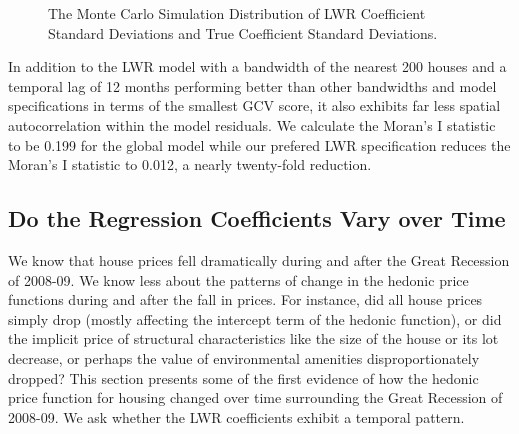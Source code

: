 \documentclass{article}\usepackage{graphicx, color}
\begin{document}
\begin{figure}
 \caption{The Monte Carlo Simulation Distribution of LWR Coefficient Standard Deviations and True Coefficient Standard Deviations.}\label{fig:MCsds}
\end{figure}
 
In addition to the LWR model with a bandwidth of the nearest 200 houses and a temporal lag of 12 months performing better than other bandwidths and model specifications in terms of the smallest GCV score, it also exhibits far less spatial autocorrelation within the model residuals. We calculate the Moran’s I statistic to be 0.199 for the global model while our prefered LWR specification reduces the Moran's I statistic to 0.012, a nearly twenty-fold reduction. 

\subsection{Do the Regression Coefficients Vary over Time}

We know that house prices fell dramatically during and after the Great Recession of 2008-09. We know less about the patterns of change in the hedonic price functions during and after the fall in prices. For instance, did all house prices simply drop (mostly affecting the intercept term of the hedonic function), or did the implicit price of structural characteristics like the size of the house or its lot decrease, or perhaps the value of environmental amenities disproportionately dropped? This section presents some of the first evidence of how the hedonic price function for housing changed over time surrounding the Great Recession of 2008-09. We ask whether the LWR coefficients exhibit a temporal pattern. 
\end{document}

